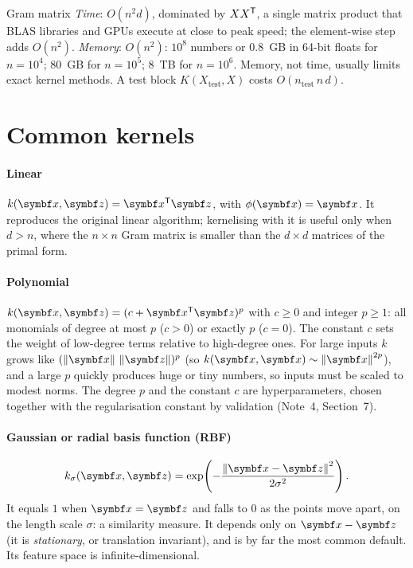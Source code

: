 \documentclass[11pt]{article}
\newcommand{\z}{\vect{z}}
\begin{document}
\begin{runtime}{Gram matrix}
\emph{Time}: $O(n^2 d)$, dominated by $XX^{\mathsf{T}}$, a single matrix product that BLAS libraries and GPUs execute at close to
peak speed; the element-wise step adds $O(n^2)$. \emph{Memory}: $O(n^2)$: $10^8$ numbers or 0.8~GB in 64-bit floats for
$n = 10^4$; 80~GB for $n = 10^5$; 8~TB for $n = 10^6$. Memory, not time, usually limits exact kernel methods. A test
block $K(X_{\mathrm{test}}, X)$ costs $O(n_{\mathrm{test}}\, n\, d)$.
\end{runtime}

\section{Common kernels}\label{sec:common}

\paragraph{Linear} $k(\x, \z) = \x\T\z$, with $\phi(\x) = \x$. It reproduces the original linear algorithm; kernelising
with it is useful only when $d > n$, where the $n \times n$ Gram matrix is smaller than the $d \times d$ matrices of the
primal form.

\paragraph{Polynomial} $k(\x, \z) = (c + \x\T\z)^p$ with $c \ge 0$ and integer $p \ge 1$: all monomials of degree at most
$p$ ($c > 0$) or exactly $p$ ($c = 0$). The constant $c$ sets the weight of low-degree terms relative to high-degree
ones. For large inputs $k$ grows like $(\norm{\x}\,\norm{\z})^p$ (so $k(\x, \x) \sim \norm{\x}^{2p}$), and a large $p$
quickly produces huge or tiny numbers, so inputs must be scaled to modest norms. The degree $p$ and the constant $c$
are hyperparameters, chosen together with the regularisation constant by validation (Note~4, Section~7).

\paragraph{Gaussian or radial basis function (RBF)}
\begin{equation}\label{eq:rbf}
  k_\sigma(\x, \z) = \exp\!\left(-\frac{\norm{\x - \z}^2}{2\sigma^2}\right).
\end{equation}
It equals $1$ when $\x = \z$ and falls to $0$ as the points move apart, on the length scale $\sigma$: a similarity
measure. It depends only on $\x - \z$ (it is \emph{stationary}, or translation invariant), and is by far the most common
default. Its feature space is infinite-dimensional.
\end{document}
